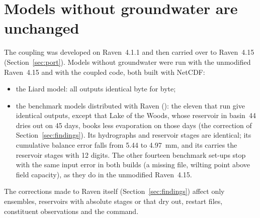 \section{Models without groundwater are unchanged}\label{sec:regression}
The coupling was developed on Raven~4.1.1 and then carried over to Raven~4.15 (Section~\ref{sec:port}). Models without
groundwater were run with the unmodified Raven~4.15 and with the coupled code, both built with NetCDF:
\begin{itemize}
\item the Liard model: all outputs identical byte for byte;
\item the benchmark models distributed with Raven (): the eleven that run give identical
      outputs, except that Lake of the Woods, whose reservoir in basin~44 dries out on 45 days, books less evaporation on
      those days (the correction of Section~\ref{sec:findings}). Its hydrographs and reservoir stages are identical; its
      cumulative balance error falls from 5.44 to 4.97~mm, and its  carries the reservoir stages with 12
      digits. The other fourteen benchmark set-ups stop with the same input error in both builds (a missing  file,
      wilting point above field capacity), as they do in the unmodified Raven~4.15.
\end{itemize}
The corrections made to Raven itself (Section~\ref{sec:findings}) affect only ensembles, reservoirs with absolute stages or
that dry out, restart files, constituent observations and the  command.

